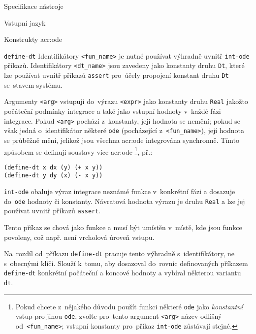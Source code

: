 \documentclass[thesis=M,czech]{FITthesis}[2012/06/26]
\newcommand{\acrlabel}[1]{acr:#1}
\newcommand{\acr}[1]{\acrshort{\acrlabel{#1}}}
\newcommand{\id}[1]{\texttt{#1}}
\newcommand{\hl}[1]{\textit{#1}}
\begin{document}
\begin{section}{Specifikace nástroje}
\begin{subsection}{Vstupní jazyk}
\begin{subsubsection}{Konstrukty \acr{ode}}
\begin{paragraph}{\id{define-dt}}
Identifikátory \id{<fun\_\-name>}
je nutné používat výhradně uvnitř \id{int-ode} příkazů.
Identifikátory \id{<dt\_\-name>} jsou zavedeny jako konstanty druhu \id{Dt},
které lze používat uvnitř příkazů \id{assert}
pro~účely propojení konstant druhu \id{Dt} se~stavem systému.

Argumenty \id{<arg>} vstupují do~výrazu \id{<expr>}
jako konstanty druhu \id{Real} jakožto počáteční podmínky integrace
a také jako vstupní hodnoty v~každé fázi integrace.
Pokud \id{<arg>} pochází z~konstanty, její hodnota se nemění;
pokud se však jedná o~identifikátor některé \id{ode}
(pocházející z~\id{<fun\_\-name>}),
její hodnota se průběžně mění,
jelikož jsou všechna \acr{ode} integrována synchronně.
Tímto způsobem se definují soustavy více \acr{ode}%
\footnote{Pokud chcete z~nějakého důvodu
použít funkci některé \id{ode}
jako \hl{konstantní} vstup pro jinou \id{ode},
zvolte pro~tento argument \id{<arg>}
název odlišný od~\id{<fun\_\-name>};
vstupní konstanty pro~příkaz \id{int-ode} zůstávají stejné.}, př.:
\begin{center}
\id{(define-dt x dx (y) (+ x y))}\\
\id{(define-dt y dy (x) (- x y))}
\end{center}
\end{paragraph} %


\begin{paragraph}{\id{int-ode}}\label{p:design:spec:ilang:ode:int}
obaluje výraz integrace neznámé funkce v~konkrétní fázi
a dosazuje do~\id{ode} hodnoty či konstanty.
Návratová hodnota výrazu je druhu \id{Real} a lze jej používat
uvnitř příkazů \id{assert}.

Tento příkaz se chová jako funkce a musí být umístěn v~místě,
kde jsou funkce povoleny,
což např. není vrcholová úroveň vstupu.

Na~rozdíl od~příkazu \id{define\--dt} pracuje tento
výhradně s~identifikátory, ne s~obecnými klíči.
Slouží k~tomu, aby dosazoval do~rovnic definovaných
příkazem \id{define\--dt} konkrétní
počáteční a koncové hodnoty
a vybíral některou variantu \id{dt}.


\end{paragraph}
\end{subsubsection}
\end{subsection}
\end{section}
\end{document}
